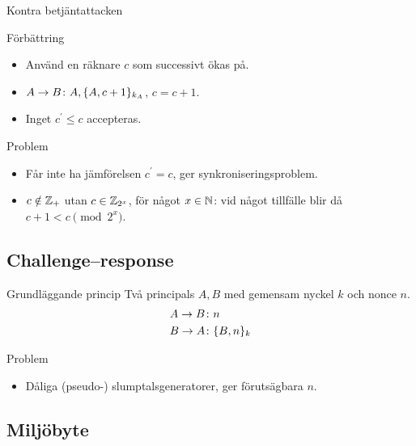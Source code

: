 \begin{frame}{Kontra betjäntattacken}
  \begin{block}{Förbättring}
    \begin{itemize}
      \item Använd en räknare \(c\) som successivt ökas på.
      \item \(A\to B\colon A, \{A, c+1\}_{k_A}\), \(c = c+1\).
      \item Inget \(c^\prime \leq c\) accepteras.
    \end{itemize}
  \end{block}
  \begin{block}{Problem}
    \begin{itemize}
      \item Får inte ha jämförelsen \(c^\prime = c\), ger 
        synkroniseringsproblem.
      \item \(c\notin \operatorname{\mathbb{Z}}_+\) utan \(c\in \operatorname{\mathbb{Z}}_{2^x}\), för något \(x\in \operatorname{\mathbb{N}}\): vid 
        något tillfälle blir då \(c+1 < c \pmod{2^x}\).
    \end{itemize}
  \end{block}
\end{frame}

\subsection{Challenge--response}

\begin{frame}
  \begin{block}{Grundläggande princip}
    Två principals \(A, B\) med gemensam nyckel \(k\) och nonce \(n\).
    \begin{align*}
      A\to B &\colon n \\
      B\to A &\colon \{B, n\}_{k}
    \end{align*}
  \end{block}
  \begin{block}{Problem}
    \begin{itemize}
      \item Dåliga (pseudo-) slumptalsgeneratorer, ger förutsägbara \(n\).
    \end{itemize}
  \end{block}
\end{frame}

\subsection{Miljöbyte}

